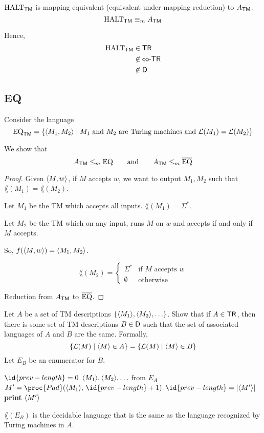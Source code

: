 \begin{corollary}
    $\mathrm{HALT}_{\mathsf{TM}}$ is mapping equivalent (equivalent under mapping reduction) to $A_{\mathsf{TM}}$.
    $$
    \mathrm{HALT}_{\mathsf{TM}} \equiv_{m} A_{\mathsf{TM}}
    $$
\end{corollary}

Hence,
$$
\begin{aligned}
    \mathrm{HALT}_{\mathsf{TM}} &\in \mathsf{TR} \\
    &\not\in \mathsf{co}\text{-}\mathsf{TR} \\
    &\not\in \mathsf{D}
\end{aligned}
$$

\subsection{EQ}

Consider the language
$$
\mathrm{EQ}_{\mathsf{TM}} = \{ \langle M_1,M_2 \rangle \mid \text{$M_1$ and $M_2$ are Turing machines and $\mathcal{L}(M_1) = \mathcal{L}(M_2)$} \}
$$

We show that
$$
A_{\mathsf{TM}} \leq_{m} \mathrm{EQ} \qquad \text{and} \qquad A_{\mathsf{TM}} \leq_m \overline{\mathrm{EQ}}
$$

\begin{proof}
    Given $\langle M,w \rangle$, if $M$ accepts $w$, we want to output $M_1,M_2$ such that $\lang(M_1) = \lang(M_2)$.

    Let $M_1$ be the TM which accepts all inputs. $\lang(M_1) = \Sigma^*$.
    
    Let $M_2$ be the TM which on any input, runs $M$ on $w$ and accepts if and only if $M$ accepts.

    So, $f(\langle M,w \rangle) = \langle M_1,M_2 \rangle$.

    $$
    \lang(M_2) = \begin{cases}
        \Sigma^* & \text{if $M$ accepts $w$} \\
        \emptyset & \text{otherwise}
    \end{cases}
    $$

    Reduction from $A_{\mathsf{TM}}$ to $\overline{\mathrm{EQ}}$.
\end{proof}

Let $A$ be a set of TM descriptions $\{\langle M_1 \rangle,\langle M_2 \rangle,\ldots\}$. Show that if $A \in \mathsf{TR}$, then there is some set of TM descriptions $B \in \mathsf{D}$ such that the set of associated languages of $A$ and $B$ are the same. Formally,
$$
\{ \mathcal{L}(M) \mid \langle M \rangle \in A \} = \{ \mathcal{L}(M) \mid \langle M \rangle \in B \} 
$$
Let $E_B$ be an enumerator for $B$.
\begin{codebox}
    \li $\id{prev-length} = 0$
    \li \For $\langle M_1 \rangle,\langle M_2 \rangle,\ldots$ from $E_A$ \Do
        \li $M' = \proc{Pad}(\encoding{M_1},\, \id{prev-length} + 1)$
        \li $\id{prev-length} = |\encoding{M'}|$
        \li \textbf{print} $\langle M' \rangle$
\end{codebox}
$\lang(E_B)$ is the decidable language that is the same as the language recognized by Turing machines in $A$.

